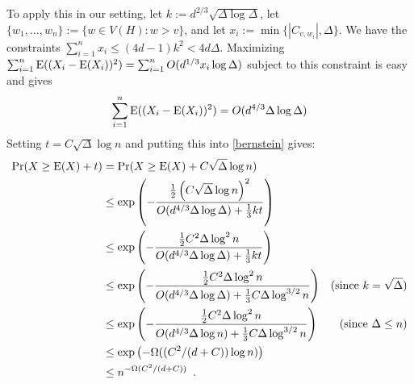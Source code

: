 \documentclass{patmorin}
\begin{document}
To apply this in our setting, let $k:=d^{2/3}\sqrt{\Delta\log\Delta}$, let $\{w_1,\ldots,w_n\}:=\{w\in V(H):w>v\}$, and let $x_i:=\min\{|C_{v,w_i}|,\Delta\}$.  We have the constraints $\sum_{i=1}^n x_i \le (4d-1)k^2 < 4d\Delta$.  Maximizing $\sum_{i=1}^n\mathrm{E}((X_i-\mathrm{E}(X_i))^2)=\sum_{i=1}^n O(d^{1/3}x_i\log \Delta)$ subject to this constraint is easy and gives
\[
  \sum_{i=1}^n\mathrm{E}((X_i-\mathrm{E}(X_i))^2) = O(d^{4/3}\Delta\log \Delta)
\]
Setting $t=C\sqrt{\Delta}\log n$ and putting this into \cref{bernstein} gives:
\begin{align*}
  \Pr(X\ge \mathrm{E}(X)+t)
  & = \Pr(X\ge \mathrm{E}(X)+C\sqrt{\Delta}\log n) \\
  & \le \exp \left(-\frac{\tfrac{1}{2}\left(C\sqrt{\Delta}\log n\right)^2}{O(d^{4/3}\Delta\log\Delta) + \tfrac{1}{3}kt}\right) \\
  & \le \exp \left(-\frac{\tfrac{1}{2}C^2\Delta\log^2 n}{O(d^{4/3}\Delta\log\Delta) + \tfrac{1}{3}kt}\right) \\
  & \le \exp \left(-\frac{\tfrac{1}{2}C^2\Delta\log^2 n}{O(d^{4/3}\Delta\log\Delta) + \tfrac{1}{3}C\Delta\log^{3/2}n}\right) & \text{(since $k=\sqrt{\Delta}$)} \\
  & \le \exp \left(-\frac{\tfrac{1}{2}C^2\Delta\log^2 n}{O(d^{4/3}\Delta\log n) + \tfrac{1}{3}C\Delta\log^{3/2} n}\right)
  & \text{(since $\Delta \le n$)} \\
  & \le \exp \left(-\Omega((C^2/(d+C))\log n)\right) \\
  & \le n^{-\Omega(C^2/(d+C))} \enspace .
\end{align*}
\end{document}
